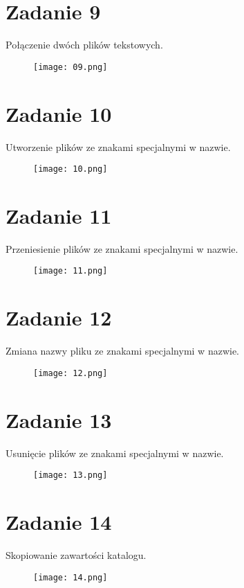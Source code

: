 \documentclass[fleqn,onecolumn,a4paper,12pt,titlepage]{article}
\begin{document}
\section*{Zadanie 9}
Połączenie dwóch plików tekstowych.
\begin{figure}[H]%
    \centering\texttt{[image: 09.png]}
\end{figure}

\section*{Zadanie 10}
Utworzenie plików ze znakami specjalnymi w nazwie.
\begin{figure}[H]%
    \centering\texttt{[image: 10.png]}
\end{figure}

\section*{Zadanie 11}
Przeniesienie plików ze znakami specjalnymi w nazwie.
\begin{figure}[H]%
    \centering\texttt{[image: 11.png]}
\end{figure}

\section*{Zadanie 12}
Zmiana nazwy pliku ze znakami specjalnymi w nazwie.
\begin{figure}[H]%
    \centering\texttt{[image: 12.png]}
\end{figure}

\section*{Zadanie 13}
Usunięcie plików ze znakami specjalnymi w nazwie.
\begin{figure}[H]%
    \centering\texttt{[image: 13.png]}
\end{figure}

\section*{Zadanie 14}
Skopiowanie zawartości katalogu.
\begin{figure}[H]%
    \centering\texttt{[image: 14.png]}
\end{figure}
\end{document}

